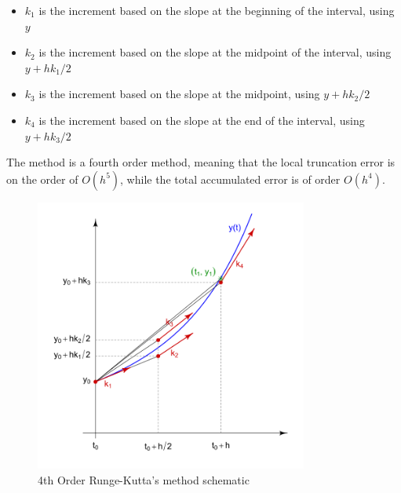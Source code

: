 \documentclass[10pt,b5paper,titlepage]{book}
\begin{document}
\begin{itemize}
    \item $ k_1 $ is the increment based on the slope at the beginning of the
    interval, using $ y $

    \item $ k_2 $ is the increment based on the slope at the midpoint of the interval,
        using $ y + h k_1 / 2 $

    \item $ k_3 $ is the increment based on the slope at the midpoint,
        using $ y + h k_2 / 2 $

    \item $ k_4 $ is the increment based on the slope at the end of the interval,
        using $ y + h k_3 / 2 $

\end{itemize}

The method is a fourth order method, meaning that the local truncation error is
on the order of $ O(h^5) $, while the total accumulated error is of order $ O(h^4) $.

\begin{figure}[ht]
    \centering
    \includegraphics[width=0.80\textwidth]{img/Runge-Kutta_slopes.png}
    \caption{4th Order Runge-Kutta's method schematic}
    \label{fig:rk4-schema-png}
\end{figure}
\end{document}
